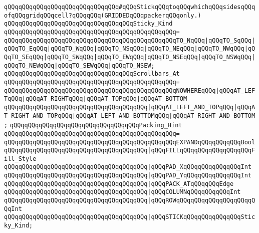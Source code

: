 \verb|qQQqqQQqqQQqqQQqqQQqqQQqqQQqqQQq#qQQqStickqQQqtoqQQqwhichqQQqsidesqQQqofqQQqgridqQQqcell?qQQqqQQq(GRIDDEDqQQqpackerqQQqonly.)|\newline
\newline
\verb|qQQqqQQqqQQqqQQqqQQqqQQqqQQqqQQqqQQqSticky_Kind|\newline
\verb|qQQqqQQqqQQqqQQqqQQqqQQqqQQqqQQqqQQqqQQqqQQqqQQq=|\newline
\verb|qQQqqQQqqQQqqQQqqQQqqQQqqQQqqQQqqQQqqQQqqQQqqQQqTO_NqQQq|\verb#|qQQqTO_SqQQq|qQQqTO_EqQQq|qQQqTO_WqQQq|qQQqTO_NSqQQq|qQQqTO_NEqQQq|qQQqTO_NWqQQq|qQQqTO_SEqQQq|qQQqTO_SWqQQq|qQQqTO_EWqQQq|qQQqTO_NSEqQQq|qQQqTO_NSWqQQq|qQQqTO_NEWqQQq|qQQqTO_SEWqQQq|qQQqTO_NSEW;#\newline
\newline
\verb|qQQqqQQqqQQqqQQqqQQqqQQqqQQqqQQqqQQqScrollbars_At|\newline
\verb|qQQqqQQqqQQqqQQqqQQqqQQqqQQqqQQqqQQqqQQqqQQqqQQq=|\newline
\verb|qQQqqQQqqQQqqQQqqQQqqQQqqQQqqQQqqQQqqQQqqQQqqQQqNOWHEREqQQq|\verb#|qQQqAT_LEFTqQQq|qQQqAT_RIGHTqQQq|qQQqAT_TOPqQQq|qQQqAT_BOTTOM#\newline
\verb|qQQqqQQqqQQqqQQqqQQqqQQqqQQqqQQqqQQqqQQq|\verb#|qQQqAT_LEFT_AND_TOPqQQq|qQQqAT_RIGHT_AND_TOPqQQq|qQQqAT_LEFT_AND_BOTTOMqQQq|qQQqAT_RIGHT_AND_BOTTOM;#\newline
\newline
\verb|qQQqqQQqqQQqqQQqqQQqqQQqqQQqqQQqqQQqPacking_Hint|\newline
\verb|qQQqqQQqqQQqqQQqqQQqqQQqqQQqqQQqqQQqqQQqqQQqqQQq=|\newline
\verb|qQQqqQQqqQQqqQQqqQQqqQQqqQQqqQQqqQQqqQQqqQQqqQQqEXPANDqQQqqQQqqQQqBool|\newline
\verb|qQQqqQQqqQQqqQQqqQQqqQQqqQQqqQQqqQQqqQQq|\verb#|qQQqFILLqQQqqQQqqQQqqQQqqQQqFill_Style#\newline
\verb|qQQqqQQqqQQqqQQqqQQqqQQqqQQqqQQqqQQqqQQq|\verb#|qQQqPAD_XqQQqqQQqqQQqqQQqInt#\newline
\verb|qQQqqQQqqQQqqQQqqQQqqQQqqQQqqQQqqQQqqQQq|\verb#|qQQqPAD_YqQQqqQQqqQQqqQQqInt#\newline
\verb|qQQqqQQqqQQqqQQqqQQqqQQqqQQqqQQqqQQqqQQq|\verb#|qQQqPACK_ATqQQqqQQqEdge#\newline
\verb|qQQqqQQqqQQqqQQqqQQqqQQqqQQqqQQqqQQqqQQq|\verb#|qQQqCOLUMNqQQqqQQqqQQqInt#\newline
\verb|qQQqqQQqqQQqqQQqqQQqqQQqqQQqqQQqqQQqqQQq|\verb#|qQQqROWqQQqqQQqqQQqqQQqqQQqqQQqInt#\newline
\verb|qQQqqQQqqQQqqQQqqQQqqQQqqQQqqQQqqQQqqQQq|\verb#|qQQqSTICKqQQqqQQqqQQqqQQqSticky_Kind;#\newline
